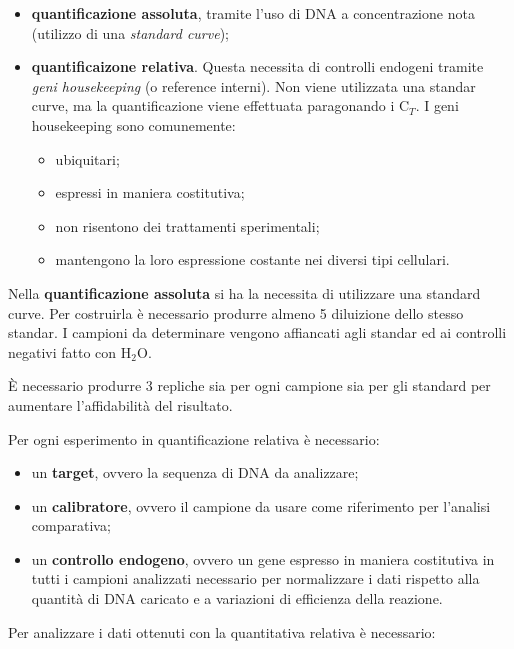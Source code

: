 \documentclass[]{article}
\begin{document}
\begin{itemize}
\itemsep1pt\parskip0pt
\item
  \textbf{quantificazione assoluta}, tramite l'uso di DNA a
  concentrazione nota (utilizzo di una \emph{standard curve});
\item
  \textbf{quantificaizone relativa}. Questa necessita di controlli
  endogeni tramite \emph{geni housekeeping} (o reference interni). Non
  viene utilizzata una standar curve, ma la quantificazione viene
  effettuata paragonando i C\(_T\). I geni housekeeping sono
  comunemente:

  \begin{itemize}
  \itemsep1pt\parskip0pt
  \item
    ubiquitari;
  \item
    espressi in maniera costitutiva;
  \item
    non risentono dei trattamenti sperimentali;
  \item
    mantengono la loro espressione costante nei diversi tipi cellulari.
  \end{itemize}
\end{itemize}

Nella \textbf{quantificazione assoluta} si ha la necessita di utilizzare
una standard curve. Per costruirla è necessario produrre almeno 5
diluizione dello stesso standar. I campioni da determinare vengono
affiancati agli standar ed ai controlli negativi fatto con H\(_2\)O.

È necessario produrre 3 repliche sia per ogni campione sia per gli
standard per aumentare l'affidabilità del risultato.

Per ogni esperimento in quantificazione relativa è necessario:

\begin{itemize}
\itemsep1pt\parskip0pt
\item
  un \textbf{target}, ovvero la sequenza di DNA da analizzare;
\item
  un \textbf{calibratore}, ovvero il campione da usare come riferimento
  per l'analisi comparativa;
\item
  un \textbf{controllo endogeno}, ovvero un gene espresso in maniera
  costitutiva in tutti i campioni analizzati necessario per normalizzare
  i dati rispetto alla quantità di DNA caricato e a variazioni di
  efficienza della reazione.
\end{itemize}

Per analizzare i dati ottenuti con la quantitativa relativa è
necessario:
\end{document}
